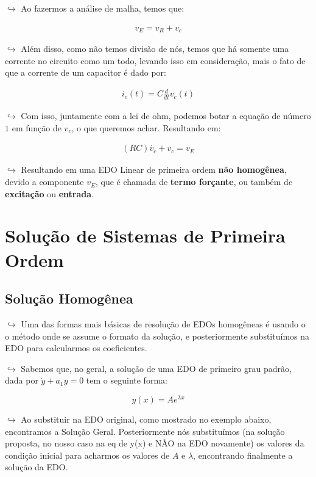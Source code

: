 \documentclass[]{article}
\begin{document}
  \(\hookrightarrow\) Ao fazermos a análise de malha, temos que:

  \[
  \begin{align}v_E = v_R + v_c\end{align}
  \]

  \(\hookrightarrow\) Além disso, como não temos divisão de nós, temos que
  há somente uma corrente no circuito como um todo, levando isso em
  consideração, mais o fato de que a corrente de um capacitor é dado por:

  \[
  \begin{align}i_c(t) = C \frac{d}{dt}v_c(t)\end{align}
  \]

  \(\hookrightarrow\) Com isso, juntamente com a lei de ohm, podemos botar
  a equação de número \(1\) em função de \(v_c\), o que queremos achar.
  Resultando em:

  \[
  \begin{align}(RC)\dot{v_c} + v_c = v_E\end{align}
  \]

  \(\hookrightarrow\) Resultando em uma EDO Linear de primeira ordem
  \textbf{não homogênea}, devido a componente \(v_E\), que é chamada de
  \textbf{termo forçante}, ou também de \textbf{excitação} ou
  \textbf{entrada}.

  \hypertarget{soluuxe7uxe3o-de-sistemas-de-primeira-ordem}{%
  \section{Solução de Sistemas de Primeira
  Ordem}\label{soluuxe7uxe3o-de-sistemas-de-primeira-ordem}}

  \hypertarget{soluuxe7uxe3o-homoguxeanea}{%
  \subsection{Solução Homogênea}\label{soluuxe7uxe3o-homoguxeanea}}

  \(\hookrightarrow\) Uma das formas mais básicas de resolução de EDOs
  homogêneas é usando o o método onde se assume o formato da solução, e
  posteriormente substituímos na EDO para calcularmos os coeficientes.

  \(\hookrightarrow\) Sabemos que, no geral, a solução de uma EDO de
  primeiro grau padrão, dada por \(\dot y + a_1y = 0\) tem o seguinte
  forma:

  \[
  y(x) = Ae^{\lambda x}
  \]

  \(\hookrightarrow\) Ao substituir na EDO original, como mostrado no
  exemplo abaixo, encontramos a Solução Geral. Posteriormente nós
  substituímos (na solução proposta, no nosso caso na eq de y(x) e NÃO na
  EDO novamente) os valores da condição inicial para acharmos os valores
  de \(A\) e \(\lambda\), encontrando finalmente a solução da EDO.
\end{document}
